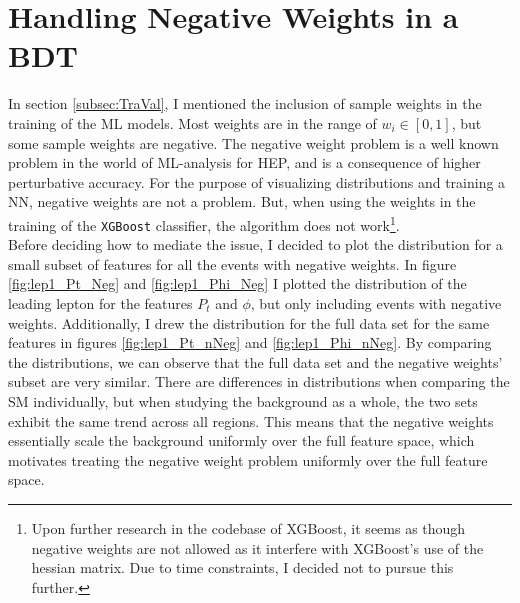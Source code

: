 \section{Handling Negative Weights in a BDT}\label{subsec:negWeights}
In section \ref{subsec:TraVal}, I mentioned the inclusion of sample weights in the training 
of the \ac{ML} models. Most weights are in the range of $w_i \in [0,1]$, but some sample weights are negative.
The negative weight problem is a well known problem in the world of \ac{ML}-analysis for \ac{HEP}, 
and is a consequence of higher perturbative accuracy. For the purpose of visualizing 
distributions and training a \ac{NN}, negative weights are not a problem. But, when using 
the weights in the training of the \verb!XGBoost! classifier, the algorithm does not work\footnote{Upon further research 
in the codebase of XGBoost, it seems as though negative weights are not allowed as it interfere with XGBoost's use 
of the hessian matrix. Due to time constraints, I decided not to  pursue this further.}.  
\\
Before deciding how to mediate the issue, I decided to plot the distribution for 
a small subset of features for all the events with negative weights.
In figure \ref{fig:lep1_Pt_Neg} and \ref{fig:lep1_Phi_Neg} I plotted the distribution of the leading 
lepton for the features $P_t$ and $\phi$, but only including events with negative weights.
Additionally, I drew the distribution for the full data set for the same features in figures \ref{fig:lep1_Pt_nNeg}
and \ref{fig:lep1_Phi_nNeg}. By comparing the distributions, we can observe that the full data set and the 
negative weights' subset are very similar. There are differences in distributions when comparing the \ac{SM} 
individually, but when studying the background as a whole, the two sets exhibit the same trend across all 
regions. This means that the negative weights essentially scale the background uniformly over the full feature 
space, which motivates treating the negative weight problem uniformly over the full feature space.
